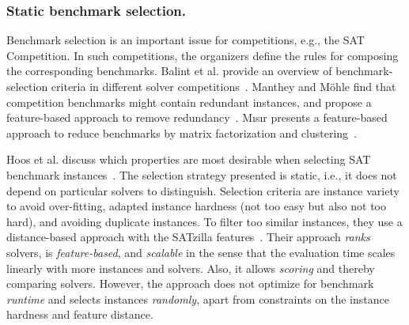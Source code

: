 \documentclass[runningheads]{llncs}
\begin{document}
\subsubsection{Static benchmark selection.}

Benchmark selection is an important issue for competitions, e.g., the SAT Competition.
In such competitions, the organizers define the rules for composing the corresponding benchmarks.
Balint et al. provide an overview of benchmark-selection criteria in different solver competitions~\cite{balint2015overview}.
Manthey and Möhle find that competition benchmarks might contain redundant instances, and propose a feature-based approach to remove redundancy~\cite{manthey2016better}.
M{\i}s{\i}r presents a feature-based approach to reduce benchmarks by matrix factorization and clustering~\cite{misir2021benchmark}.

Hoos et al. discuss which properties are most desirable when selecting SAT benchmark instances~\cite{HoosKSS13}.
The selection strategy presented is static, i.e., it does not depend on particular solvers to distinguish.
Selection criteria are instance variety to avoid over-fitting, adapted instance hardness (not too easy but also not too hard), and avoiding duplicate instances.
To filter too similar instances, they use a distance-based approach with the SATzilla features~\cite{XuHHL08,features}.
Their approach \emph{ranks} solvers, is \emph{feature-based}, and \emph{scalable} in the sense that the evaluation time scales linearly with more instances and solvers.
Also, it allows \emph{scoring} and thereby comparing solvers.
However, the approach does not optimize for benchmark \emph{runtime} and selects instances \emph{randomly}, apart from constraints on the instance hardness and feature distance.
\end{document}
